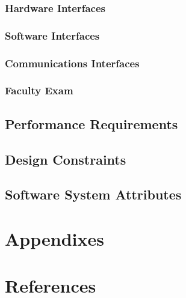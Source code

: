 \documentclass{scrreprt}
\begin{document}
\subsection{Hardware Interfaces}



\subsection{Software Interfaces}



\subsection{Communications Interfaces}




\subsection{Faculty Exam}


\section{Performance Requirements}

\section{Design Constraints}


\section{Software System Attributes}


\chapter{Appendixes}

\chapter{References}



\printindex
\end{document}
